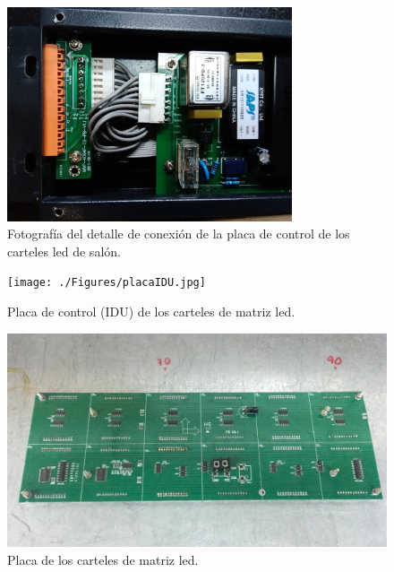 \begin{figure}[H]
	\centering
	\includegraphics[width=0.75\textwidth]{./Figures/displayController.jpg}
	\caption{Fotografía del detalle de conexión de la placa de control de los carteles led de salón.}
	\label{fig:displayController}
\end{figure}


\begin{figure}[H]
	\centering
	\texttt{[image: ./Figures/placaIDU.jpg]}
	\caption{Placa de control (IDU) de los carteles de matriz led.}
	\label{fig:placa}
\end{figure}

\begin{figure}[H]
	\centering
	\includegraphics[width=1\textwidth]{./Figures/cartel2x6.jpeg}
	\caption{Placa de los carteles de matriz led.}
	\label{fig:placaDisplay}
\end{figure}


